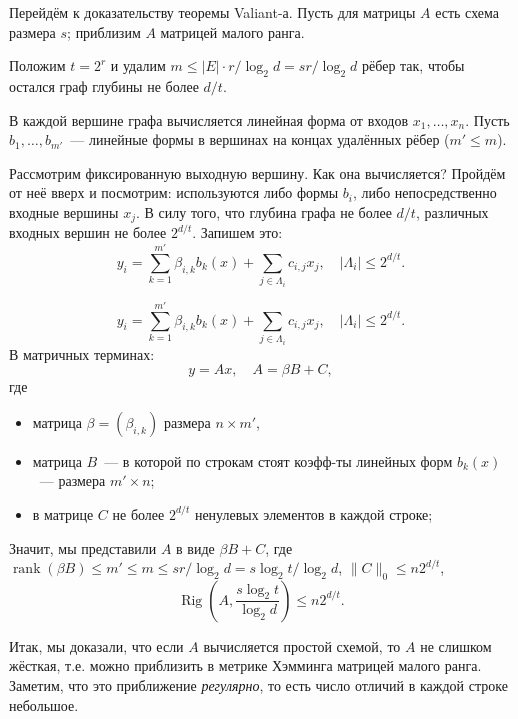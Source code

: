 \documentclass[handout]{beamer}
\renewcommand\le{\leqslant}
\DeclareMathOperator{\rank}{rank}
\DeclareMathOperator{\Rig}{Rig}
\begin{document}
\begin{frame}
    Перейдём к доказательству теоремы Valiant-а. Пусть для матрицы $A$ есть
    схема размера $s$; приблизим $A$ матрицей малого ранга.
    \pause\vspace{5pt}

    Положим $t=2^r$ и удалим $m\le|E|\cdot r/\log_2d=sr/\log_2d$ рёбер так, чтобы
    остался граф глубины не более $d/t$.
    \pause\vspace{5pt}

    В каждой вершине графа вычисляется линейная форма от входов
    $x_1,\ldots,x_n$. Пусть $b_1,\ldots,b_{m'}$~--- линейные формы в вершинах на
    концах удалённых рёбер ($m'\le m$).
    \pause\vspace{5pt}

    Рассмотрим фиксированную выходную вершину. Как она вычисляется? Пройдём от неё вверх и
    посмотрим: используются либо формы $b_i$, либо непосредственно входные
    вершины $x_j$. В силу того, что глубина графа не более $d/t$, различных
    входных вершин не более $2^{d/t}$. Запишем это:
    $$
    y_i = \sum_{k=1}^{m'} \beta_{i,k} b_k(x) + \sum_{j\in\Lambda_i}c_{i,j}x_j,\quad
    |\Lambda_i|\le 2^{d/t}.
    $$
\end{frame}

\begin{frame}
    $$
    y_i = \sum_{k=1}^{m'} \beta_{i,k} b_k(x) + \sum_{j\in\Lambda_i}c_{i,j}x_j,\quad
    |\Lambda_i|\le 2^{d/t}.
    $$
    В матричных терминах:
    $$
    y = Ax,\quad A = \beta B + C,
    $$
    \pause
    где 
    \begin{itemize}
        \item матрица $\beta=(\beta_{i,k})$ размера $n\times m'$,
        \item матрица $B$~--- в которой по строкам стоят коэфф-ты линейных форм
            $b_k(x)$~--- размера $m'\times n$;
        \item в матрице $C$ не более $2^{d/t}$ ненулевых элементов в каждой
            строке;
    \end{itemize}
    \pause

    Значит, мы представили $A$ в виде $\beta B+C$, где $\rank(\beta
    B)\le m'\le m\le sr/\log_2d=s\log_2t/\log_2d$, $\|C\|_0\le n2^{d/t}$,
    $$
    \Rig(A,\frac{s\log_2t}{\log_2d})\le n2^{d/t}.
    $$
\end{frame}

\begin{frame}
    Итак, мы доказали, что если $A$ вычисляется простой схемой, то $A$ не
    слишком жёсткая, т.е. можно приблизить в метрике Хэмминга матрицей малого
    ранга. Заметим, что это приближение \textit{регулярно}, то есть число
    отличий в каждой строке небольшое.
\end{frame}
\end{document}
